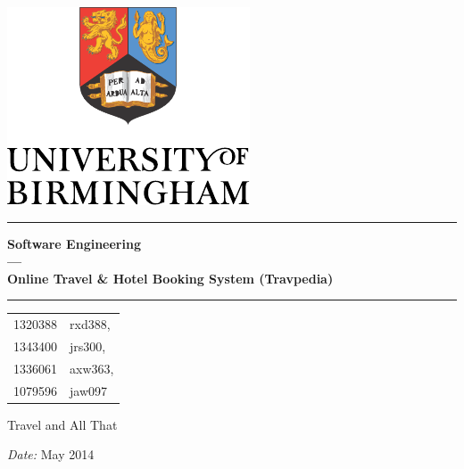 \begin{titlepage}
	\begin{center}
	\vspace*{\fill}

	\centering
	\includegraphics[scale=1.2]{Logo.pdf}
	\vfill

	\hrule
	{\LARGE\bf Software Engineering \\
		--- \\
		Online Travel \& Hotel Booking System (Travpedia)\\[0.4cm]}
	\hrule

	\vfill

	\vfill
		\begin{tabular}[h]{cl}
		1320388 & rxd388,\\
		1343400 & jrs300,\\
		1336061 & axw363,\\
		1079596 & jaw097
		\end{tabular}
	\vfill
	Travel and All That

	\vfill
	\vfill
	\textit{Date:} May 2014
	\vfill
	\vfill

	\end{center}
\end{titlepage}
